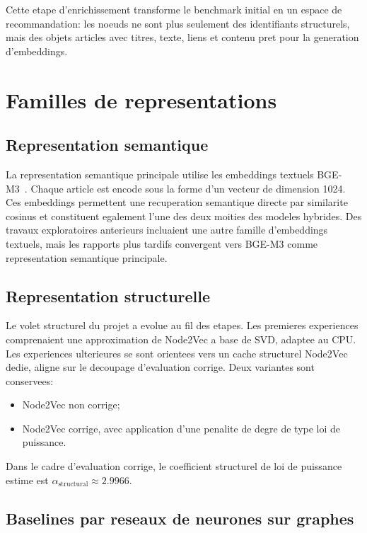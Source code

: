 Cette etape d'enrichissement transforme le benchmark initial en un espace de
recommandation: les noeuds ne sont plus seulement des identifiants
structurels, mais des objets articles avec titres, texte, liens et contenu
pret pour la generation d'embeddings.

\section{Familles de representations}

\subsection{Representation semantique}

La representation semantique principale utilise les embeddings textuels
BGE-M3~\cite{chen2025bgem3}. Chaque article est encode sous la forme d'un
vecteur de dimension 1024. Ces embeddings permettent une recuperation
semantique directe par similarite cosinus et constituent egalement l'une des
deux moities des modeles hybrides. Des travaux exploratoires anterieurs
incluaient une autre famille d'embeddings textuels, mais les rapports plus
tardifs convergent vers BGE-M3 comme representation semantique principale.

\subsection{Representation structurelle}

Le volet structurel du projet a evolue au fil des etapes. Les premieres
experiences comprenaient une approximation de Node2Vec a base de SVD, adaptee
au CPU. Les experiences ulterieures se sont orientees vers un cache structurel
Node2Vec dedie, aligne sur le decoupage d'evaluation corrige. Deux variantes
sont conservees:
\begin{itemize}
    \item Node2Vec non corrige;
    \item Node2Vec corrige, avec application d'une penalite de degre de type
    loi de puissance.
\end{itemize}

Dans le cadre d'evaluation corrige, le coefficient structurel de loi de
puissance estime est
$\alpha_{\text{structural}} \approx 2.9966$.

\subsection{Baselines par reseaux de neurones sur graphes}

